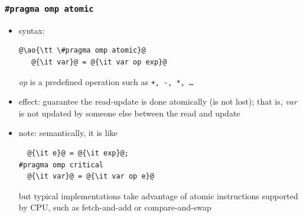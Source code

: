 \documentclass[12pt,dvipdfmx]{beamer}
\newcommand{\ao}[1]{{\color{blue}#1}}
\begin{document}
\begin{frame}[fragile]
\frametitle{{\tt \#pragma omp atomic}}
\begin{itemize}
\item \ao{syntax:}
\begin{lstlisting}
@\ao{\tt \#pragma omp atomic}@
   @{\it var}@ = @{\it var op exp}@
\end{lstlisting}
{\it op} is a predefined operation such as {\tt +, -, *, \ldots}

\item \ao{effect:} guarantee the read-update is done atomically
  (is not lost); that is,
  {\it var} is not updated by someone else
  between the read and update

\item note: semantically, it is like
\begin{lstlisting}
  @{\it e}@ = @{\it exp}@;
#pragma omp critical
  @{\it var}@ = @{\it var op e}@
\end{lstlisting}
but typical implementations take advantage of
atomic instructions supported by CPU,
such as fetch-and-add or compare-and-swap
\end{itemize}
\end{frame}
\end{document}
